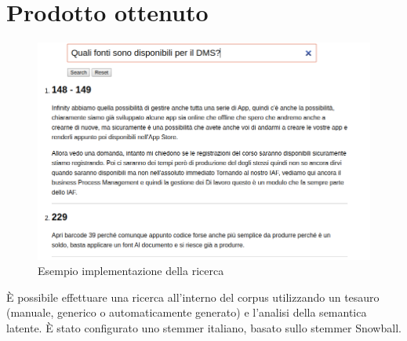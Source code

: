 \section{Prodotto ottenuto}
\begin{center}
    \begin{figure}
        \includegraphics[scale=0.55]{immagini/ricerca.png}
        \caption{Esempio implementazione della ricerca}
     \end{figure}
\end{center}

È possibile effettuare una ricerca all'interno del corpus utilizzando un tesauro (manuale, generico o automaticamente generato) e l'analisi della semantica latente. È stato configurato uno stemmer italiano, basato sullo stemmer Snowball.

